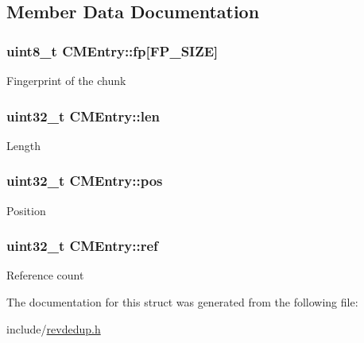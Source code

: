 \subsection{\-Member \-Data \-Documentation}
\hypertarget{structCMEntry_a4edfc6334502a1563f4b0e0737bf7134}{
\subsubsection[{fp}]{\setlength{\rightskip}{0pt plus 5cm}uint8\-\_\-t {\bf \-C\-M\-Entry\-::fp}\mbox{[}{\bf \-F\-P\-\_\-\-S\-I\-Z\-E}\mbox{]}}}\label{structCMEntry_a4edfc6334502a1563f4b0e0737bf7134}
\-Fingerprint of the chunk \hypertarget{structCMEntry_aaf3dd315b41ef4381c27ec6ce7a65f8f}{
\subsubsection[{len}]{\setlength{\rightskip}{0pt plus 5cm}uint32\-\_\-t {\bf \-C\-M\-Entry\-::len}}}\label{structCMEntry_aaf3dd315b41ef4381c27ec6ce7a65f8f}
\-Length \hypertarget{structCMEntry_a4fd391c9e176a8a0b6ff58134d39917d}{
\subsubsection[{pos}]{\setlength{\rightskip}{0pt plus 5cm}uint32\-\_\-t {\bf \-C\-M\-Entry\-::pos}}}\label{structCMEntry_a4fd391c9e176a8a0b6ff58134d39917d}
\-Position \hypertarget{structCMEntry_ac57dde891eb1232477653a7775aa0b55}{
\subsubsection[{ref}]{\setlength{\rightskip}{0pt plus 5cm}uint32\-\_\-t {\bf \-C\-M\-Entry\-::ref}}}\label{structCMEntry_ac57dde891eb1232477653a7775aa0b55}
\-Reference count 

\-The documentation for this struct was generated from the following file\-:\begin{DoxyCompactItemize}
\item 
include/\hyperlink{revdedup_8h}{revdedup.\-h}\end{DoxyCompactItemize}
